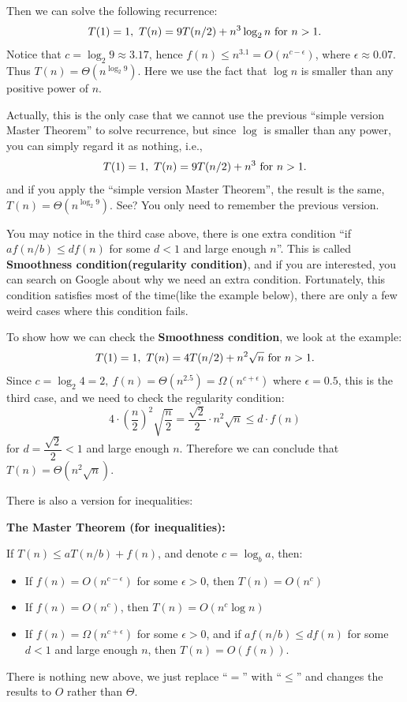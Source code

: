\begin{spacing}{1.3}
    Then we can solve the following recurrence:
    $$T(1)=1,\ T(n)=9T(n/2)+n^3\log_2 n\ {\rm for\ }n>1.$$
    Notice that $c=\log_2 9\approx 3.17$, hence 
    $f(n)\le n^{3.1}=O(n^{c-\epsilon})$, where $\epsilon\approx 0.07$.
    Thus $T(n)=\Theta(n^{\log_2 9})$.
    Here we use the fact that $\log n$ is smaller than any positive power 
    of $n$.

    Actually, this is the only case that we cannot use the previous ``simple version
    Master Theorem'' to solve recurrence, but since $\log$ is smaller than any 
    power, you can simply regard it as nothing, i.e., 
    $$T(1)=1,\ T(n)=9T(n/2)+n^3\ {\rm for\ }n>1.$$
    and if you apply the ``simple version Master Theorem'', the result is the same, 
    $T(n)=\Theta(n^{\log_2 9})$. See? You only need to remember the previous version.

    \vspace{0.2in}
    You may notice in the third case above, there is one extra condition 
    ``if $af(n/b)\le df(n)$ for some $d<1$ and large enough $n$''. This is called 
    {\bf Smoothness condition(regularity condition)}, 
    and if you are interested, you can search on Google
    about why we need an extra condition. Fortunately, this condition satisfies 
    most of the time(like the example below), 
    there are only a few weird cases where this condition fails.
    
    To show how we can check the {\bf Smoothness condition}, we look at the example:
    $$T(1)=1,\ T(n)=4T(n/2)+n^2 \sqrt{n}\ {\rm for\ }n>1.$$
    Since $c=\log_2 4=2,\ f(n)=\Theta(n^{2.5})=\Omega(n^{c+\epsilon})$ where $\epsilon=0.5$,
    this is the third case, and we need to check the regularity condition:
    $$4\cdot \left(\frac{n}{2}\right)^2 \sqrt{\frac{n}{2}}=\frac{\sqrt{2}}{2}\cdot n^2\sqrt{n}\le d\cdot f(n)$$
    for $d=\dfrac{\sqrt{2}}{2}<1$ and large enough $n$.
    Therefore we can conclude that $T(n)=\Theta(n^2\sqrt{n})$.

    \vspace{0.3in}
    There is also a version for inequalities:
    \begin{theorem}
        {\bf The Master Theorem (for inequalities):} 

        If $T(n)\le aT(n/b)+f(n)$, and denote $c=\log_b a$, then:
        \begin{itemize}
            \item If $f(n)=O(n^{c-\epsilon})$ for some $\epsilon > 0$, then $T(n)=O(n^c)$
            \item If $f(n)=O(n^c)$, then $T(n)=O(n^c\log n)$
            \item If $f(n)=\Omega(n^{c+\epsilon})$ for some $\epsilon > 0$, and if 
            $af(n/b)\le df(n)$ for some $d<1$ and large enough $n$, then $T(n)=O(f(n))$.
        \end{itemize}
    \end{theorem}
    There is nothing new above, we just replace ``$=$'' with ``$\le $'' and 
    changes the results to $O$ rather than $\Theta$.






\end{spacing}
